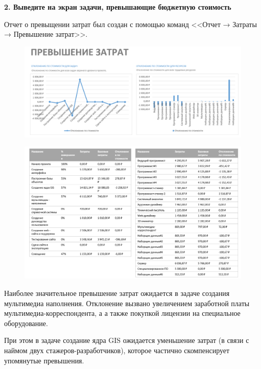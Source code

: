 \textbf{2. Выведите на экран задачи, превышающие бюджетную стоимость}

Отчет о превыщении затрат был создан с помощью команд <<Отчет → Затраты → Превышение затрат>>.

\begin{figure}[h!]
	\begin{center}
		\includegraphics[scale=0.5]{inc/img/p_7.png}
	\end{center}
	\captionsetup{justification=centering}
	\label{fig:u3}
\end{figure}

\begin{figure}[h!]
	\begin{center}
		\includegraphics[scale=0.5]{inc/img/p_8.png}
	\end{center}
	\captionsetup{justification=centering}
	\label{fig:u3}
\end{figure}

Наиболее значительное превышение затрат ожидается в задаче создания мультимедиа наполнения. Отклонение вызвано увеличением заработной платы мультимедиа-корреспондента, а а также покупкой лицензии на специальное оборудование.

При этом в задаче создание ядра GIS ожидается
уменьшение затрат (в связи с наймом двух стажеров-разработчиков), которое частично скомпенсирует
упомянутые превышения.

